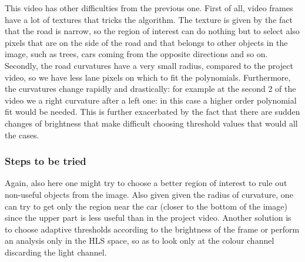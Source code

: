 \documentclass{article}
\begin{document}
This video has other difficulties from the previous one. First of all, video frames have a lot of textures that tricks the algorithm. The texture is given by the fact that the road is narrow, so the region of interest can do nothing but to select also pixels that are on the side of the road and that belongs to other objects in the image, such as trees, cars coming from the opposite directions and so on. Secondly, the road curvatures have a very small radius, compared to the project video, so we have less lane pixels on which to fit the polynomials. Furthermore, the curvatures change rapidly and drastically: for example at the second 2 of the video we a right curvature after a left one: in this case a higher order polynomial fit would be needed. This is further exacerbated by the fact that there are sudden changes of brightness that make difficult choosing threshold values that would all the cases.


\subsubsection{Steps to be tried}
Again, also here one might try to choose a better region of interest to rule out non-useful objects from the image. Also given given the radius of curvature, one can try to get only the region near the car (closer to the bottom of the image) since the upper part is less useful than in the project video. Another solution is to choose adaptive thresholds according to the brightness of the frame or perform an analysis only in the HLS space, so as to look only at the colour channel discarding the light channel.
\end{document}
